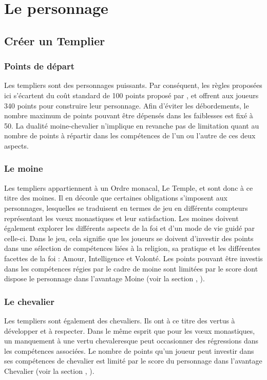 \chapter{Le personnage}\label{chap:personnage}
\section{Créer un Templier}\label{sec:creeruntemplier}
\subsection{Points de départ}\label{sec:pointsdedepart}
Les templiers sont des personnages puissants. Par conséquent, les règles
proposées ici s'écartent du coût standard de 100 points proposé par
\cite[p.~20]{B}, et offrent aux joueurs 340 points pour construire leur
personnage. Afin d'éviter les débordements, le nombre maximum de points pouvant être dépensés dans les faiblesses est fixé à 50. La dualité moine-chevalier
n'implique en revanche pas de limitation quant au nombre de points à répartir
dans les compétences de l'un ou l'autre de ces deux aspects.
\subsection{Le moine}\label{sec:lemoine}
Les templiers appartiennent à un Ordre monacal, Le Temple, et sont donc à ce
titre des moines. Il en découle que certaines obligations s'imposent aux
personnages, lesquelles se traduisent en termes de jeu en différents compteurs
représentant les vœux monastiques et leur satisfaction. Les moines doivent
également explorer les différents aspects de la foi et d'un mode de vie guidé
par celle-ci. Dans le jeu, cela signifie que les joueurs se doivent d'investir
des points dans une sélection de compétences liées à la religion, sa pratique
et les différentes facettes de la foi : Amour, Intelligence et Volonté. Les
points pouvant être investis dans les compétences régies par le cadre de moine
sont limitées par le score dont dispose le personnage dans l'avantage Moine
(voir la section , ).
\subsection{Le chevalier}\label{sec:lechevalier}
Les templiers sont également des chevaliers. Ils ont à ce titre des vertus à
développer et à respecter. Dans le même esprit que pour les vœux monastiques,
un manquement à une vertu chevaleresque peut occasionner des régressions dans
les compétences associées. Le nombre de points qu'un joueur peut investir dans
ses compétences de chevalier est limité par le score du personnage dans
l'avantage Chevalier (voir la section ,
).
